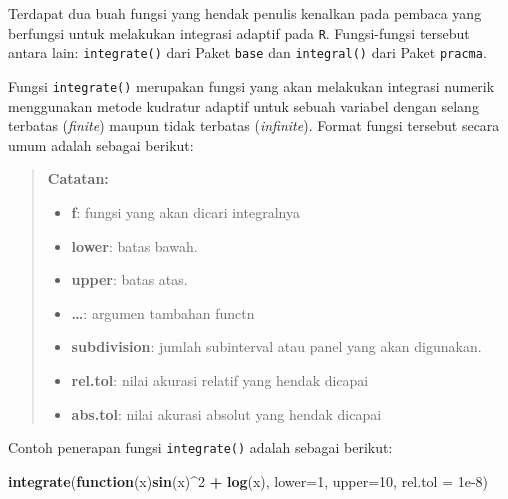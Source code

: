 \documentclass[]{book}
\newenvironment{Shaded}{\begin{snugshade}}{\end{snugshade}}
\newcommand{\ControlFlowTok}[1]{\textcolor[rgb]{0.13,0.29,0.53}{\textbf{#1}}}
\newcommand{\DataTypeTok}[1]{\textcolor[rgb]{0.13,0.29,0.53}{#1}}
\newcommand{\DecValTok}[1]{\textcolor[rgb]{0.00,0.00,0.81}{#1}}
\newcommand{\FloatTok}[1]{\textcolor[rgb]{0.00,0.00,0.81}{#1}}
\newcommand{\KeywordTok}[1]{\textcolor[rgb]{0.13,0.29,0.53}{\textbf{#1}}}
\newcommand{\NormalTok}[1]{#1}
\newcommand{\OperatorTok}[1]{\textcolor[rgb]{0.81,0.36,0.00}{\textbf{#1}}}
\newcommand{\StringTok}[1]{\textcolor[rgb]{0.31,0.60,0.02}{#1}}
\providecommand{\tightlist}{%
  \setlength{\itemsep}{0pt}\setlength{\parskip}{0pt}}
\theoremstyle{definition}
\theoremstyle{definition}
\theoremstyle{definition}
\theoremstyle{remark}
\begin{document}
Terdapat dua buah fungsi yang hendak penulis kenalkan pada pembaca yang berfungsi untuk melakukan integrasi adaptif pada \texttt{R}. Fungsi-fungsi tersebut antara lain: \texttt{integrate()} dari Paket \texttt{base} dan \texttt{integral()} dari Paket \texttt{pracma}.

Fungsi \texttt{integrate()} merupakan fungsi yang akan melakukan integrasi numerik menggunakan metode kudratur adaptif untuk sebuah variabel dengan selang terbatas (\emph{finite}) maupun tidak terbatas (\emph{infinite}). Format fungsi tersebut secara umum adalah sebagai berikut:

\begin{Shaded}
\end{Shaded}

\begin{quote}
\textbf{Catatan:}

\begin{itemize}
\tightlist
\item
  \textbf{f}: fungsi yang akan dicari integralnya
\item
  \textbf{lower}: batas bawah.
\item
  \textbf{upper}: batas atas.
\item
  \textbf{\ldots{}}: argumen tambahan functn
\item
  \textbf{subdivision}: jumlah subinterval atau panel yang akan digunakan.
\item
  \textbf{rel.tol}: nilai akurasi relatif yang hendak dicapai
\item
  \textbf{abs.tol}: nilai akurasi absolut yang hendak dicapai
\end{itemize}
\end{quote}

Contoh penerapan fungsi \texttt{integrate()} adalah sebagai berikut:

\begin{Shaded}
\begin{Highlighting}[]
\KeywordTok{integrate}\NormalTok{(}\ControlFlowTok{function}\NormalTok{(x)}\KeywordTok{sin}\NormalTok{(x)}\OperatorTok{^}\DecValTok{2} \OperatorTok{+}\StringTok{ }\KeywordTok{log}\NormalTok{(x),}
          \DataTypeTok{lower=}\DecValTok{1}\NormalTok{, }\DataTypeTok{upper=}\DecValTok{10}\NormalTok{,}
          \DataTypeTok{rel.tol =} \FloatTok{1e-8}\NormalTok{)}
\end{Highlighting}
\end{Shaded}
\end{document}
